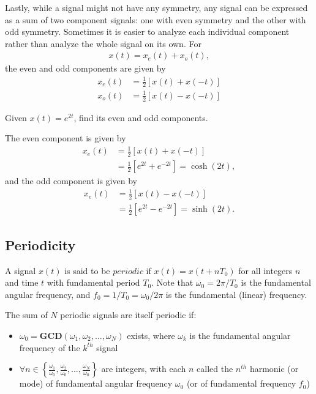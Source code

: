 \documentclass{report}
\begin{document}
Lastly, while a signal might not have any symmetry, any signal can be expressed as a sum of two component signals: one with even symmetry 
and the other with odd symmetry. Sometimes it is easier to analyze each individual component rather than analyze the whole signal on its own. For 
\begin{align}
    x(t) = x_e(t) + x_o(t),
\end{align}
the even and odd components are given by
\begin{align}
    x_e(t) &= \frac{1}{2}\left[x(t)+x(-t)\right] \\
    x_o(t) &= \frac{1}{2}\left[x(t)-x(-t)\right]
\end{align}

\begin{example}
    Given $x(t)=e^{2t}$, find its even and odd components.
\end{example}
\begin{solution}
    The even component is given by 
    \begin{align*}
        x_e(t) &= \frac{1}{2}\left[x(t)+x(-t)\right] \\
        &= \frac{1}{2}\left[e^{2t}+e^{-2t}\right] = \cosh(2t),
    \end{align*}
    and the odd component is given by 
    \begin{align*}
        x_e(t) &= \frac{1}{2}\left[x(t)-x(-t)\right] \\
        &= \frac{1}{2}\left[e^{2t}-e^{-2t}\right] = \sinh(2t).
    \end{align*}
\end{solution}
\subsection{Periodicity}
A signal $x(t)$ is said to be $periodic$ if $x(t)=x(t+nT_0)$ for all integers $n$ and time $t$ with fundamental period $T_0$. 
Note that $\omega_0=2\pi/T_0$ is the fundamental angular frequency, and $f_0=1/T_0=\omega_0/2\pi$ is the fundamental (linear) frequency.

\begin{tcolorbox}[width=\textwidth,colback={white}, sharp corners]
    The sum of $N$ periodic signals are itself periodic if:    \begin{itemize}
        \item $\omega_0=\mathbf{GCD}(\omega_1,\omega_2,...,\omega_N)$ exists, where $\omega_k$ is the fundamental angular frequency of the $k^{th}$ signal
        \item $\forall n\in\left\{\frac{\omega_1}{\omega_0}, \frac{\omega_2}{\omega_0}, ..., \frac{\omega_N}{\omega_0}\right\}$ are integers, 
        with each $n$ called the $n^{th}$ harmonic (or mode) of fundamental angular frequency $\omega_0$ (or of fundamental frequency $f_0$)
    \end{itemize}
\end{tcolorbox}
\end{document}
